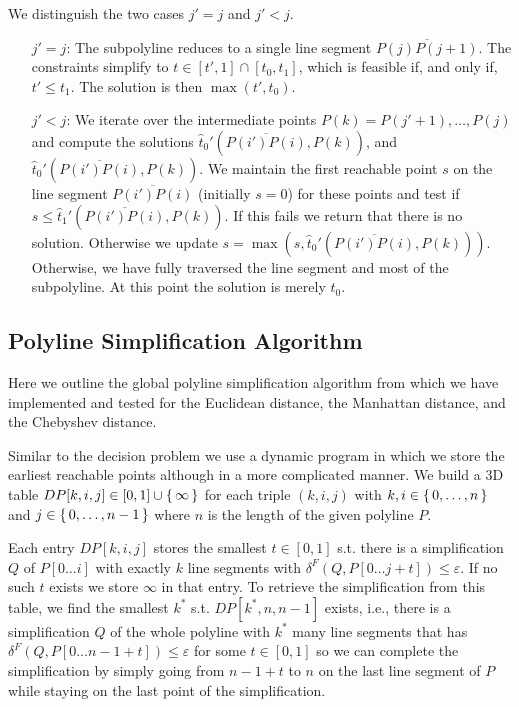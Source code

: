 We distinguish the two cases \(j' = j\) and \(j' < j\). 
\begin{enumerate}
	\item[\(j' = j\): ] The subpolyline reduces to a single line segment \(\overline{P(j)P(j+1)}\). The constraints simplify to \(t \in [t', 1] \cap [t_0, t_1]\), which is feasible if, and only if, \(t' \leq t_1\). The solution is then \(\max(t', t_0)\).

	\item[\(j' < j\): ] We iterate over the intermediate points \(P(k) = P(j'+1), \dots, P(j)\) and compute the solutions \(\hat t_0'(\overline{P(i')P(i)}, P(k))\), and \(\hat t_0'(\overline{P(i')P(i)}, P(k))\). We maintain the first reachable point \(s\) on the line segment \(\overline{P(i')P(i)}\) (initially \(s = 0\)) for these points and test if \(s \leq \hat t_1'(\overline{P(i')P(i)}, P(k))\). If this fails we return that there is no solution. Otherwise we update \(s = \max(s, \hat t_0'(\overline{P(i')P(i)}, P(k)))\). Otherwise, we have fully traversed the line segment and most of the subpolyline. At this point the solution is merely \(t_0\).
\end{enumerate}

\subsection{Polyline Simplification Algorithm}
\label{ssec:simple_algo_main}

Here we outline the global polyline simplification algorithm from \citeauthor{on_optimal_polyline_simplification_using_the_hausdorff_and_frechet_distance} which we have implemented and tested for the Euclidean distance, the Manhattan distance, and the Chebyshev distance. 

Similar to the decision problem we use a dynamic program in which we store the earliest reachable points although in a more complicated manner. We build a 3D table \(DP[k,i,j] \in [0, 1] \cup \set{\infty}\) for each triple \((k, i, j)\) with \(k, i \in \set{0, \dots, n}\) and \(j \in \set{0, \dots, n - 1}\) where \(n\) is the length of the given polyline \(P\). 

Each entry \(DP[k, i, j]\) stores the smallest \(t \in [0, 1]\) s.t. there is a simplification \(Q\) of \(P[0 \dots i]\) with exactly \(k\) line segments with \(\delta^F(Q, P[0\dots j + t]) \leq \varepsilon\). If no such \(t\) exists we store \(\infty\) in that entry. 
To retrieve the simplification from this table, we find the smallest \(k^*\) s.t. \(DP[k^*, n, n - 1]\) exists, i.e., there is a simplification \(Q\) of the whole polyline with \(k^*\) many line segments that has \(\delta^F(Q, P[0\dots n - 1 + t]) \leq \varepsilon\) for some \(t \in [0, 1]\) so we can complete the simplification by simply going from \(n-1+t\) to \(n\) on the last line segment of \(P\) while staying on the last point of the simplification. 

